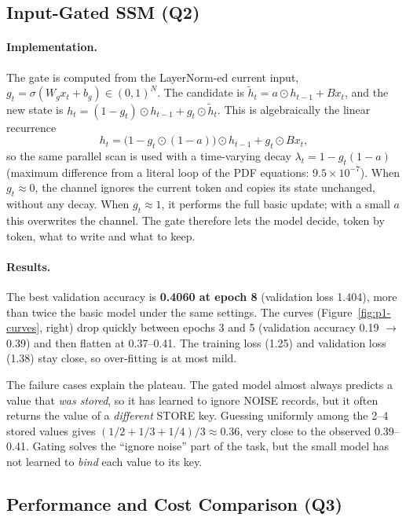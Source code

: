 \documentclass[11pt,a4paper]{article}
\begin{document}
\subsection{Input-Gated SSM (Q2)}

\paragraph{Implementation.}
The gate is computed from the LayerNorm-ed current input,
$g_t=\sigma(W_gx_t+b_g)\in(0,1)^N$. The candidate is
$\tilde h_t=a\odot h_{t-1}+Bx_t$, and the new state is
$h_t=(1-g_t)\odot h_{t-1}+g_t\odot\tilde h_t$. This is algebraically the
linear recurrence
\[
h_t=\bigl(1-g_t\odot(1-a)\bigr)\odot h_{t-1}+g_t\odot Bx_t,
\]
so the same parallel scan is used with a time-varying decay
$\lambda_t=1-g_t(1-a)$ (maximum difference from a literal loop of the
PDF equations: $9.5\times10^{-7}$). When $g_t\approx0$, the channel
ignores the current token and copies its state unchanged, without any
decay. When $g_t\approx1$, it performs the full basic update; with a
small $a$ this overwrites the channel. The gate therefore lets the model
decide, token by token, what to write and what to keep.

\paragraph{Results.}
The best validation accuracy is \textbf{0.4060 at epoch 8} (validation
loss 1.404), more than twice the basic model under the same settings.
The curves (Figure~\ref{fig:p1-curves}, right) drop quickly between
epochs 3 and 5 (validation accuracy 0.19 $\rightarrow$ 0.39) and then
flatten at 0.37--0.41. The training loss (1.25) and validation loss
(1.38) stay close, so over-fitting is at most mild.

The failure cases explain the plateau. The gated model almost always
predicts a value that \emph{was stored}, so it has learned to ignore
NOISE records, but it often returns the value of a \emph{different}
STORE key. Guessing uniformly among the 2--4 stored values gives
$(1/2+1/3+1/4)/3\approx0.36$, very close to the observed 0.39--0.41.
Gating solves the ``ignore noise'' part of the task, but the small model
has not learned to \emph{bind} each value to its key.


\subsection{Performance and Cost Comparison (Q3)}
\end{document}
